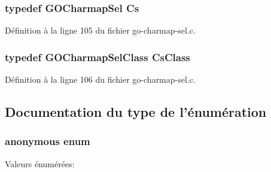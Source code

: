 \subsubsection[{Cs}]{\setlength{\rightskip}{0pt plus 5cm}typedef {\bf GOCharmapSel} {\bf Cs}}\label{go-charmap-sel_8c_a98bb6ea1d67f7e272c0fe7be5eec1ea4}


Définition à la ligne 105 du fichier go-\/charmap-\/sel.c.

\subsubsection[{CsClass}]{\setlength{\rightskip}{0pt plus 5cm}typedef {\bf GOCharmapSelClass} {\bf CsClass}}\label{go-charmap-sel_8c_a8aedb7fb0d65217b02b2136a2a891321}


Définition à la ligne 106 du fichier go-\/charmap-\/sel.c.



\subsection{Documentation du type de l'énumération}
\subsubsection[{"@2}]{\setlength{\rightskip}{0pt plus 5cm}anonymous enum}\label{go-charmap-sel_8c_a99fb83031ce9923c84392b4e92f956b5}
\begin{Desc}
\item[Valeurs énumérées: ]\par
\begin{description}
\item[{\em 
CHARMAP\_\-CHANGED\label{go-charmap-sel_8c_a99fb83031ce9923c84392b4e92f956b5a2d46d269c28f1438b81445027ac2fbc0}
}]\item[{\em 
LAST\_\-SIGNAL\label{go-charmap-sel_8c_a99fb83031ce9923c84392b4e92f956b5a0c34d85df8279641afad9e3c9b3a54ce}
}]\end{description}
\end{Desc}



